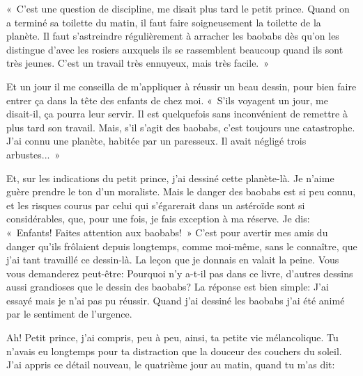 \documentclass{report}
\begin{document}

«~C'est une question de discipline, me disait plus tard le petit prince. Quand on a terminé sa toilette du matin, il faut faire soigneusement la toilette de la planète. Il faut s'astreindre régulièrement à arracher les baobabs dès qu'on les distingue d'avec les rosiers auxquels ils se rassemblent beaucoup quand ils sont très jeunes. C'est un travail très ennuyeux, mais très facile.~» 


Et un jour il me conseilla de m'appliquer à réussir un beau dessin, pour bien faire entrer ça dans la tête des enfants de chez moi. «~S'ils voyagent un jour, me disait-il, ça pourra leur servir. Il est quelquefois sans inconvénient de remettre à plus tard son travail. Mais, s'il s'agit des baobabs, c'est toujours une catastrophe. J'ai connu une planète, habitée par un paresseux. Il avait négligé trois arbustes...~»

Et, sur les indications du petit prince, j'ai dessiné cette planète-là. Je n'aime guère prendre le ton d'un moraliste. Mais le danger des baobabs est si peu connu, et les risques courus par celui qui s'égarerait dans un astéroïde sont si considérables, que, pour une fois, je fais exception à ma réserve. Je dis: «~Enfants! Faites attention aux baobabs!~» C'est pour avertir mes amis du danger qu'ils frôlaient depuis longtemps, comme moi-même, sans le connaître, que j'ai tant travaillé ce dessin-là. La leçon que je donnais en valait la peine. Vous vous demanderez peut-être: Pourquoi n'y a-t-il pas dans ce livre, d'autres dessins aussi grandioses que le dessin des baobabs? La réponse est bien simple: J'ai essayé mais je n'ai pas pu réussir. Quand j'ai dessiné les baobabs j'ai été animé par le sentiment de l'urgence.

\parachapter[VI]{} %
Ah! Petit prince, j'ai compris, peu à peu, ainsi, ta petite vie mélancolique. Tu n'avais eu longtemps pour ta distraction que la douceur des couchers du soleil. J'ai appris ce détail nouveau, le quatrième jour au matin, quand tu m'as dit:
\end{document}
